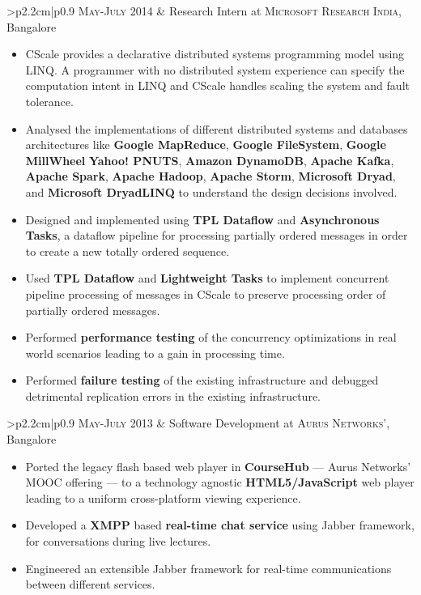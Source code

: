 \documentclass[a4paper,10pt]{article} %
\newcommand{\work}[3]{
    \begin{tabular}{>{\raggedleft}p{2.2cm}|p{0.9\linewidth}}
        \textsc{#1} & \textcolor{NavyBlue}{#2}
                    \footnotesize{#3}
    \end{tabular}
}
\begin{document}
\work {May-July 2014}
      {Research Intern at \textsc{Microsoft Research India}, Bangalore}
      {
         \begin{itemize}[leftmargin=*]
             \item CScale provides a declarative distributed systems programming model using LINQ. A programmer with no distributed system
                 experience can specify the computation intent in LINQ and CScale handles scaling the system and fault tolerance.
             \item Analysed the implementations of different distributed systems and databases architectures like
                 \textbf{Google MapReduce}, \textbf{Google FileSystem}, \textbf{Google MillWheel} \textbf{Yahoo! PNUTS},
                 \textbf{Amazon DynamoDB}, \textbf{Apache Kafka}, \textbf{Apache Spark}, \textbf{Apache Hadoop}, \textbf{Apache Storm},
                 \textbf{Microsoft Dryad}, and \textbf{Microsoft DryadLINQ} to understand the design decisions involved.
             \item Designed and implemented using \textbf{TPL Dataflow} and \textbf{Asynchronous Tasks}, a dataflow pipeline for
                 processing partially ordered messages in order to create a new totally ordered sequence.
             \item Used \textbf{TPL Dataflow} and \textbf{Lightweight Tasks} to implement concurrent pipeline processing of messages in
                 CScale to preserve processing order of partially ordered messages.
             \item Performed \textbf{performance testing} of the concurrency optimizations in real world scenarios leading to a gain in processing time.
             \item Performed \textbf{failure testing} of the existing infrastructure and debugged detrimental replication errors in the
                 existing infrastructure.
         \end{itemize}
     }

\work {May-July 2013}
      {Software Development at \textsc{Aurus Networks'}, Bangalore}
      {
          \begin{itemize}[leftmargin=*]
              \item Ported the legacy flash based web player in \textbf{CourseHub} --- Aurus Networks' MOOC offering --- to a technology agnostic
                  \textbf{HTML5/JavaScript} web player leading to a uniform cross-platform viewing experience.
              \item Developed a \textbf{XMPP} based \textbf{real-time chat service} using Jabber framework, for conversations during live lectures.
              \item Engineered an extensible Jabber framework for real-time communications between different services.
          \end{itemize}
      }
\end{document}
